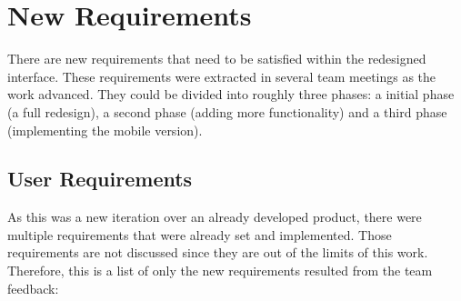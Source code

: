 \section{New Requirements} %
\label{sec:new_requirements}

There are new requirements that need to be satisfied within the redesigned  interface.
These requirements were extracted in several team meetings as the work advanced.
They could be divided into roughly three phases: a initial phase (a full redesign), a second phase (adding more functionality) and a third phase (implementing the mobile version).

\subsection{User Requirements} %
\label{sub:user_requirements}

As this was a new iteration over an already developed product, there were multiple requirements that were already set and implemented.
Those requirements are not discussed since they are out of the limits of this work.
Therefore, this is a list of only the new requirements resulted from the team feedback:

\begin{center}
  \begin{userrequirement}
    \label{tab:requirementredesign}%
  \end{userrequirement}
\end{center}

\begin{center}
  \begin{userrequirement}
    \label{tab:requirementreadapt}%
  \end{userrequirement}
\end{center}

\begin{center}
  \begin{userrequirement}
    \label{tab:requirementdevicename}%
  \end{userrequirement}
\end{center}

